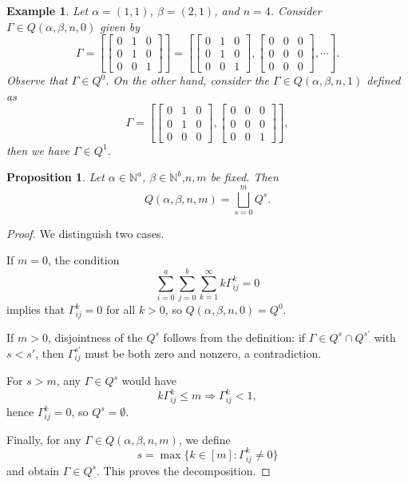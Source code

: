 \documentclass[11pt]{article}
\newtheorem{prop}[thm]{Proposition} %
\newtheorem{exa}[thm]{Example}
\begin{document}
\begin{exa}
Let $\alpha = (1,1)$, $\beta = (2,1)$, and $n = 4$. Consider  $\Gamma \in Q(\alpha,\beta,n,0)$ given by
\[
\Gamma = \left[
    \begin{bmatrix}
        0 & 1 & 0\\
        0 & 1 & 0\\
        0 & 0 & 1
    \end{bmatrix}\right]= \left[
    \begin{bmatrix}
        0 & 1 & 0\\
        0 & 1 & 0\\
        0 & 0 & 1
    \end{bmatrix},
    \begin{bmatrix}
        0 & 0 & 0\\
        0 & 0 & 0\\
        0 & 0 & 0
    \end{bmatrix}, \cdots
    \right].
\]
Observe that $\Gamma \in Q^0$. On the other hand, consider the $\Gamma \in Q(\alpha,\beta,n,1)$ defined as
\[
\Gamma = \left[
    \begin{bmatrix}
        0 & 1 & 0\\
        0 & 1 & 0\\
        0 & 0 & 0
    \end{bmatrix},
    \begin{bmatrix}
       0 & 0 & 0\\
       0 & 0 & 0\\
       0 & 0 & 1 
    \end{bmatrix}\right],
\]
then we have $\Gamma \in Q^1$.
\end{exa}


\begin{prop}\label{UDisjunta}
Let $\alpha\in\mathbb{N}^a$, $\beta \in\mathbb{N}^b$,$n,m$ be fixed. Then
$$Q(\alpha,\beta,n,m)=\bigsqcup_{s=0}^m Q^{s}.$$
\end{prop}

\begin{proof}
We distinguish two cases.

If $m = 0$, the condition
$$\displaystyle\sum_{i=0}^a\sum_{j=0}^b\sum_{k=1}^{\infty}k\Gamma_{ij}^k = 0$$
implies that $\Gamma_{ij}^k = 0$ for all $k > 0$, so $Q(\alpha,\beta,n,0) = Q^0$.

If $m > 0$, disjointness of the $Q^s$ follows from the definition: if $\Gamma \in Q^s \cap Q^{s'}$ with $s < s'$, then $\Gamma_{ij}^{s'}$ must be both zero and nonzero, a contradiction.

For $s > m$, any $\Gamma \in Q^s$ would have
$$k\Gamma_{ij}^k \leq m \Rightarrow \Gamma_{ij}^k < 1,$$
hence $\Gamma_{ij}^k = 0$, so $Q^s = \emptyset$.

Finally, for any $\Gamma \in Q(\alpha,\beta,n,m)$, we define
$$s = \max\{k \in [m] : \Gamma_{ij}^k \ne 0\}$$
and obtain $\Gamma \in Q^s$. This proves the decomposition.
\end{proof}
\end{document}
